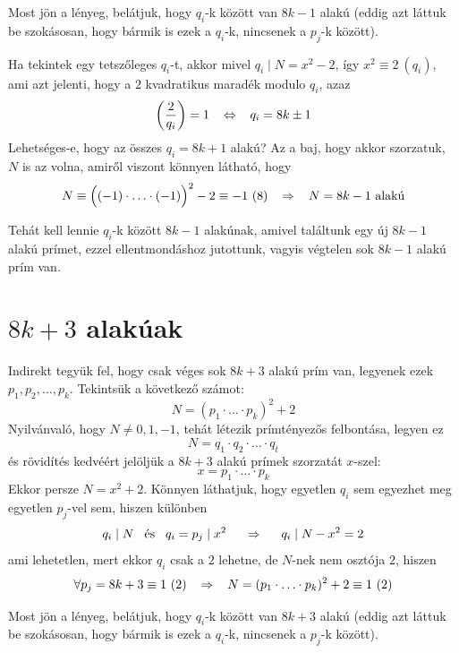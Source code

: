 \documentclass[12pt]{book}
\theoremstyle{plain} %
\theoremstyle{definition} %
\theoremstyle{remark}
\numberwithin{equation}{section}  %
\begin{document}
	Most jön a lényeg, belátjuk, hogy $q_i$-k között van $8k-1$ alakú (eddig azt láttuk be szokásosan, hogy bármik is ezek a $q_i$-k, nincsenek a $p_j$-k között).
	
	Ha tekintek egy tetszőleges $q_i$-t, akkor mivel $q_i\mid N = x^2-2$, így $x^2\equiv 2\ (q_i)$, ami azt jelenti, hogy a $2$ kvadratikus maradék modulo $q_i$, azaz
	\[ \left( \dfrac{2}{q_i} \right) = 1 \hspace{3mm} \Leftrightarrow \hspace{3mm} q_i = 8k\pm 1 \]
	Lehetséges-e, hogy az összes $q_i=8k+1$ alakú? Az a baj, hogy akkor szorzatuk, $N$ is az volna, amiről viszont könnyen látható, hogy
	\[ N \equiv \Big((-1)\cdot \ldots \cdot (-1)\Big)^2 - 2 \equiv -1  \ (8) \hspace{3mm} \Rightarrow \hspace{3mm} N=8k-1 \text{ alakú}  \]
	
	Tehát kell lennie $q_i$-k között $8k-1$ alakúnak, amivel találtunk egy új $8k-1$ alakú prímet, ezzel ellentmondáshoz jutottunk, vagyis végtelen sok $8k-1$ alakú prím van.
	
	\section{$8k+3$ alakúak}
	
	Indirekt tegyük fel, hogy csak véges sok $8k+3$ alakú prím van, legyenek ezek $p_1,p_2,\ldots,p_k$. Tekintsük a következő számot:
	\[ N = (p_1\cdot \ldots \cdot p_k)^{2} + 2  \]
	Nyilvánvaló, hogy $N\neq 0,1,-1$, tehát létezik prímtényezős felbontása, legyen ez
	\[ N = q_1\cdot q_2\cdot \ldots \cdot q_t  \]
	és rövidítés kedvéért jelöljük a $8k+3$ alakú prímek szorzatát $x$-szel:
	\[ x = p_1\cdot \ldots \cdot p_k   \]
	Ekkor persze $N=x^{2}+2$. Könnyen láthatjuk, hogy egyetlen $q_i$ sem egyezhet meg egyetlen $p_j$-vel sem, hiszen különben
	\[ q_i \mid N \hspace{3mm} \text{és} \hspace{3mm} q_i=p_j\mid x^{2} \hspace{5mm} \Rightarrow \hspace{5mm} q_i\mid N-x^{2}=2  \]
	ami lehetetlen, mert ekkor $q_i$ csak a $2$ lehetne, de $N$-nek nem osztója $2$, hiszen
	\[ \forall p_j = 8k+3 \equiv 1\ (2) \hspace{3mm} \Rightarrow \hspace{3mm} N = (p_1\cdot \ldots \cdot p_k)^2 + 2 \equiv 1\ (2)  \]
	
	Most jön a lényeg, belátjuk, hogy $q_i$-k között van $8k+3$ alakú (eddig azt láttuk be szokásosan, hogy bármik is ezek a $q_i$-k, nincsenek a $p_j$-k között).
	
\end{document}
